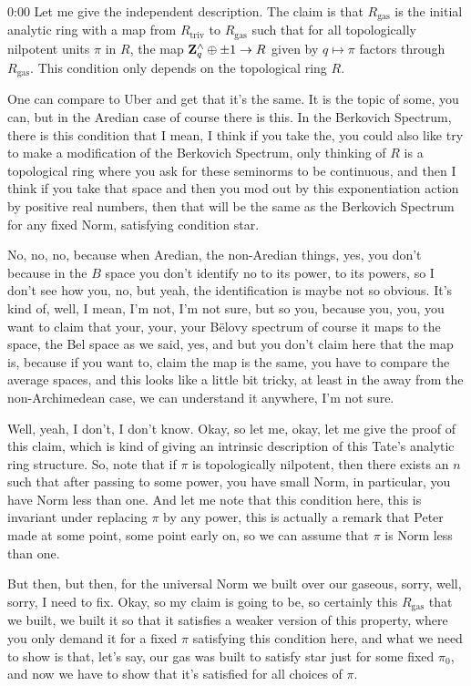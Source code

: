\begin{unfinished}{0:00}
Let me give the independent description. The claim is that $R_{\text{gas}}$ is the initial analytic ring with a map from $R_{\text{triv}}$ to $R_{\text{gas}}$ such that for all topologically nilpotent units $\pi$ in $R$, the map $\mathbf Z_q^\wedge \oplus \pm 1 \to R$ given by $q \mapsto \pi$ factors through $R_{\text{gas}}$. This condition only depends on the topological ring $R$.

One can compare to Uber and get that it's the same. It is the topic of some, you can, but in the Aredian case of course there is this. In the Berkovich Spectrum, there is this condition that I mean, I think if you take the, you could also like try to make a modification of the Berkovich Spectrum, only thinking of $R$ is a topological ring where you ask for these seminorms to be continuous, and then I think if you take that space and then you mod out by this exponentiation action by positive real numbers, then that will be the same as the Berkovich Spectrum for any fixed Norm, satisfying condition star.

No, no, no, because when Aredian, the non-Aredian things, yes, you don't because in the $B$ space you don't identify no to its power, to its powers, so I don't see how you, no, but yeah, the identification is maybe not so obvious. It's kind of, well, I mean, I'm not, I'm not sure, but so you, because you, you, you want to claim that your, your, your Bëlovy spectrum of course it maps to the space, the Bel space as we said, yes, and but you don't claim here that the map is, because if you want to, claim the map is the same, you have to compare the average spaces, and this looks like a little bit tricky, at least in the away from the non-Archimedean case, we can understand it anywhere, I'm not sure.

Well, yeah, I don't, I don't know. Okay, so let me, okay, let me give the proof of this claim, which is kind of giving an intrinsic description of this Tate's analytic ring structure. So, note that if $\pi$ is topologically nilpotent, then there exists an $n$ such that after passing to some power, you have small Norm, in particular, you have Norm less than one. And let me note that this condition here, this is invariant under replacing $\pi$ by any power, this is actually a remark that Peter made at some point, some point early on, so we can assume that $\pi$ is Norm less than one.

But then, but then, for the universal Norm we built over our gaseous, sorry, well, sorry, I need to fix. Okay, so my claim is going to be, so certainly this $R_\mathrm{gas}$ that we built, we built it so that it satisfies a weaker version of this property, where you only demand it for a fixed $\pi$ satisfying this condition here, and what we need to show is that, let's say, our gas was built to satisfy star just for some fixed $\pi_0$, and now we have to show that it's satisfied for all choices of $\pi$.


\end{unfinished}
